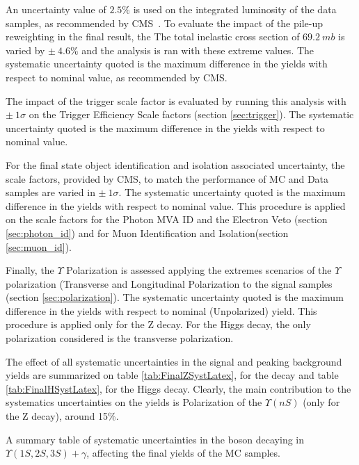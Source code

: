 An uncertainty value of $2.5\%$ is used on the integrated luminosity of the data samples, as recommended by CMS~\cite{CMS-PAS-LUM-17-001}. To evaluate the impact of the pile-up reweighting in the final result, the The total inelastic cross section of $69.2~mb$ is varied by $\pm~4.6\%$ and the analysis is ran with these extreme values. The systematic uncertainty quoted is the maximum difference in the yields with respect to nominal value, as recommended by CMS. 

The impact of the trigger scale factor is evaluated by running this analysis with $\pm~1\sigma$ on the Trigger Efficiency Scale factors (section \ref{sec:trigger}). The systematic uncertainty quoted is the maximum difference in the yields with respect to nominal value.

For the final state object identification and isolation associated uncertainty, the scale factors, provided by CMS, to match the performance of MC and Data samples are varied in  $\pm~1\sigma$. The systematic uncertainty quoted is the maximum difference in the yields with respect to nominal value. This procedure is applied on the scale factors for the Photon MVA ID and the Electron Veto (section \ref{sec:photon_id}) and for  Muon Identification and Isolation(section \ref{sec:muon_id}). 

Finally, the $\Upsilon$ Polarization is assessed applying the extremes scenarios of the $\Upsilon$ polarization (Transverse and Longitudinal Polarization to the signal samples (section \ref{sec:polarization}). The systematic uncertainty quoted is the maximum difference in the yields with respect to nominal (Unpolarized) yield. This procedure is applied only for the Z decay. For the Higgs decay, the only polarization considered is the transverse polarization.

The effect of all systematic uncertainties in the signal and peaking background yields are summarized on table \ref{tab:FinalZSystLatex}, for the \Z decay and table \ref{tab:FinalHSystLatex}, for the Higgs decay. Clearly, the main contribution to the systematics uncertainties on the yields is Polarization of the $\Upsilon(nS)$ (only for the Z decay), around 15\%.

\begin{table}[ht]
  \begin{center}
    
    \caption{ A summary table of systematic uncertainties in the \Z boson decaying in $\Upsilon(1S,2S,3S) + \gamma$, affecting the final yields of the MC samples.}
    \label{tab:FinalZSystLatex}
  \end{center}
\end{table}


